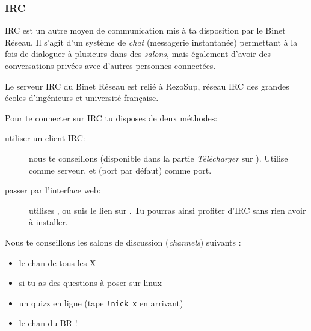 
\subsubsection{IRC}

\label{irc}

IRC est un autre moyen de communication mis à ta disposition par le Binet Réseau. Il s'agit d'un système de \emph{chat} (messagerie instantanée) permettant à la fois de dialoguer à plusieurs dans des \emph{salons}, mais également d'avoir des conversations privées avec d'autres personnes connectées.


Le serveur IRC du Binet Réseau est relié à RezoSup, réseau IRC des grandes écoles d'ingénieurs et université française.

Pour te connecter sur IRC tu disposes de deux méthodes:



\begin{description}
\item[utiliser un client IRC:] nous te conseillons  (disponible dans la partie \emph{Télécharger} sur \fkz). Utilise   comme serveur, et  (port par défaut) comme port.
  \item[passer par l'interface web:] utilises , ou suis le lien  sur \fkz. Tu pourras ainsi profiter d'IRC sans rien avoir à  installer.
\end{description}

 
Nous te conseillons les salons de discussion (\emph{channels}) suivants :
\begin{itemize}
  \item {} le chan de tous les X
  \item {} si tu as des questions \`a poser sur linux
  \item {} un quizz en ligne (tape \texttt{!nick x} en arrivant)
  \item {} le chan du BR !
\end{itemize}
